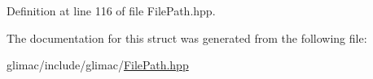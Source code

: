 Definition at line 116 of file File\+Path.\+hpp.



The documentation for this struct was generated from the following file\+:\begin{DoxyCompactItemize}
\item 
glimac/include/glimac/\hyperlink{_file_path_8hpp}{File\+Path.\+hpp}\end{DoxyCompactItemize}
